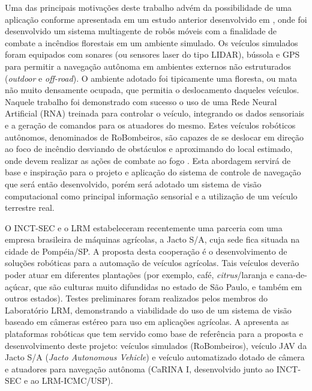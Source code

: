 Uma das principais motivações deste trabalho advém da possibilidade de uma
aplicação conforme apresentada em um estudo anterior desenvolvido em
\cite{Pessin2008}, onde foi desenvolvido um sistema multiagente de robôs móveis
com a finalidade de combate a incêndios florestais em um ambiente simulado. Os
veículos simulados foram equipados com sonares (ou sensores laser do tipo
LIDAR), bússola e GPS para permitir a navegação autônoma em ambientes externos
não estruturados (\textit{outdoor} e \textit{off-road}). O ambiente adotado foi
tipicamente uma floresta, ou mata não muito densamente ocupada, que permitia o
deslocamento daqueles veículos. Naquele trabalho foi demonstrado com sucesso o
uso de uma Rede Neural Artificial (RNA) treinada para controlar o veículo,
integrando os dados sensoriais e a geração de comandos para os atuadores do
mesmo. Estes veículos robóticos autônomos, denominados de
RoBombeiros, são capazes de se deslocar em direção ao
foco de incêndio desviando de obstáculos e aproximando do local estimado, onde
devem realizar as ações de combate ao fogo \cite{Pessin2007, Pessin2010}.
Esta abordagem servirá de base e inspiração para o projeto e aplicação do
sistema de controle de navegação que será então desenvolvido, porém será adotado
um sistema de visão computacional como principal informação sensorial e a
utilização de um veículo terrestre real.

O INCT-SEC e o LRM estabeleceram recentemente uma parceria com uma empresa
brasileira de máquinas agrícolas, a Jacto S/A, cuja sede fica
situada na cidade de Pompéia/SP. A proposta desta cooperação é o desenvolvimento
de soluções robóticas para a automação de veículos agrícolas. Tais veículos
deverão poder atuar em diferentes plantações (por exemplo, café,
\textit{citrus}/laranja e cana-de-açúcar, que são culturas muito difundidas no
estado de São Paulo, e também em outros estados). Testes preliminares foram
realizados pelos membros do Laboratório LRM, demonstrando a viabilidade do uso
de um sistema de visão baseado em câmeras estéreo para uso em aplicações
agrícolas.
A  apresenta as plataformas robóticas que tem servido como base de
referência para a proposta e desenvolvimento deste projeto:
veículos simulados (RoBombeiros), veículo JAV da Jacto S/A (\textit{Jacto
Autonomous Vehicle}) e veículo automatizado dotado de câmera e atuadores para
navegação autônoma (CaRINA I, desenvolvido junto ao INCT-SEC e ao LRM-ICMC/USP).

